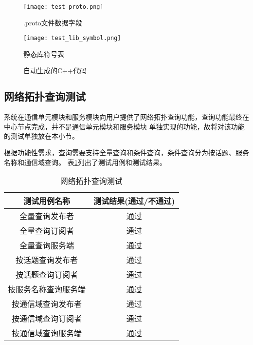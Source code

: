 \begin{figure}[H]
  \centering
  \texttt{[image: test\_proto.png]}
  \caption{.proto文件数据字段}
  \label{test_proto}
\end{figure}
\begin{figure}[H]
  \centering
  \texttt{[image: test\_lib\_symbol.png]}
  \caption{静态库符号表}
  \label{test_lib_symbol}
\end{figure}

\begin{figure}[H]
  \centering
  \caption{自动生成的C++代码}
  \label{test_middle_languange}
\end{figure}

\subsection{网络拓扑查询测试}
系统在通信单元模块和服务模块向用户提供了网络拓扑查询功能，查询功能最终在中心节点完成，并不是通信单元模块和服务模块
单独实现的功能，故将对该功能的测试单独放在本小节。

根据功能性需求，查询需要支持全量查询和条件查询，条件查询分为按话题、服务名称和通信域查询。
表\ref{network_info_query}列出了测试用例和测试结果。
\begin{table}[H]
  \centering\small
  \caption{网络拓扑查询测试}
  \renewcommand\arraystretch{1.2}
  \label{network_info_query}
  \begin{tabular}{cc}
    \toprule
    测试用例名称 & 测试结果(通过/不通过) \\
    \midrule
    全量查询发布者 & 通过 \\
    全量查询订阅者 & 通过 \\
    全量查询服务端 & 通过 \\
    按话题查询发布者 & 通过 \\
    按话题查询订阅者 & 通过 \\
    按服务名称查询服务端 & 通过 \\
    按通信域查询发布者 & 通过 \\
    按通信域查询订阅者 & 通过 \\
    按通信域查询服务端 & 通过 \\
    \bottomrule
  \end{tabular}
\end{table}

